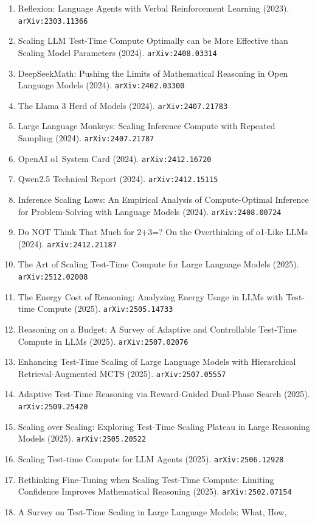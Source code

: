 \documentclass[11pt]{article}
\begin{document}
\begin{enumerate}
  \item Reflexion: Language Agents with Verbal Reinforcement Learning (2023). \texttt{arXiv:2303.11366}
  \item Scaling LLM Test-Time Compute Optimally can be More Effective than
  Scaling Model Parameters (2024). \texttt{arXiv:2408.03314}
  \item DeepSeekMath: Pushing the Limits of Mathematical Reasoning in Open
  Language Models (2024). \texttt{arXiv:2402.03300}
  \item The Llama 3 Herd of Models (2024). \texttt{arXiv:2407.21783}
  \item Large Language Monkeys: Scaling Inference Compute with Repeated Sampling (2024). \texttt{arXiv:2407.21787}
  \item OpenAI o1 System Card (2024). \texttt{arXiv:2412.16720}
  \item Qwen2.5 Technical Report (2024). \texttt{arXiv:2412.15115}
  \item Inference Scaling Laws: An Empirical Analysis of Compute-Optimal
  Inference for Problem-Solving with Language Models (2024). \texttt{arXiv:2408.00724}
  \item Do NOT Think That Much for 2+3=? On the Overthinking of o1-Like LLMs (2024). \texttt{arXiv:2412.21187}
  \item The Art of Scaling Test-Time Compute for Large Language Models (2025). \texttt{arXiv:2512.02008}
  \item The Energy Cost of Reasoning: Analyzing Energy Usage in LLMs with Test-time Compute (2025). \texttt{arXiv:2505.14733}
  \item Reasoning on a Budget: A Survey of Adaptive and Controllable Test-Time Compute in LLMs (2025). \texttt{arXiv:2507.02076}
  \item Enhancing Test-Time Scaling of Large Language Models with Hierarchical Retrieval-Augmented MCTS (2025). \texttt{arXiv:2507.05557}
  \item Adaptive Test-Time Reasoning via Reward-Guided Dual-Phase Search (2025). \texttt{arXiv:2509.25420}
  \item Scaling over Scaling: Exploring Test-Time Scaling Plateau in Large Reasoning Models (2025). \texttt{arXiv:2505.20522}
  \item Scaling Test-time Compute for LLM Agents (2025). \texttt{arXiv:2506.12928}
  \item Rethinking Fine-Tuning when Scaling Test-Time Compute: Limiting Confidence Improves Mathematical Reasoning (2025). \texttt{arXiv:2502.07154}
  \item A Survey on Test-Time Scaling in Large Language Models: What, How,

\end{enumerate}
\end{document}
